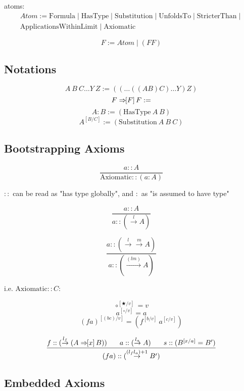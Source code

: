 \documentclass{article}
\newcommand{\presep}{\hspace{1.8em}}
\newcommand{\subst}[3]{#1^{[{#2}{/}{#3}]}}
\newcommand{\bindvariable}{\bigstar}
\newcommand{\hole}{\circ}
\newcommand{\hastype}[2]{#1 : #2}
\newcommand{\hastypemeta}[2]{#1 :: #2}
\newcommand{\treemappinguntyped}[2]{\Rightarrow\hspace{-0.4em}[#1]\,#2}
\newcommand{\treemappingtype}[3]{#1 \treemappinguntyped{#2}{#3}}
\newcommand{\unfoldsin}[1]{\overset{#1}{\rightarrow}}
\begin{document}
  
  atoms:
  \begin{multline*}
   Atom := \mathrm{Formula} \mid \mathrm{HasType} \mid \mathrm{Substitution} \mid \mathrm{UnfoldsTo} \mid \mathrm{StricterThan} \mid\\
   \mathrm{ApplicationsWithinLimit} \mid \mathrm{Axiomatic}
  \end{multline*}


  \[ F := Atom \mid (F F) \]


  \subsection{Notations}

  \[ A\ B\ C \dots Y\ Z := ((\dots ((A B) C) \dots Y) Z) \]
  \[ \treemappingtype{F}{F}{F} := \]
  \[ \hastype{A}{B} := (\mathrm{HasType}\ A\ B) \]
  \[ \subst{A}{B}{C} := (\mathrm{Substitution}\ A\ B\ C) \]

  \subsection{Bootstrapping Axioms}

  \[ \frac{\hastypemeta{a}{A}}{\hastypemeta{\mathrm{Axiomatic}}{(\hastype{a}{A})}} \]



  $::$ can be read as "has type globally", and $:$ as "is assumed to have type"

  \[ \frac{
    \hastypemeta{a}{A}
  }{
    \hastypemeta{a}{(\unfoldsin{l}A)}
  } \]

  \[ \frac{
    \hastypemeta{a}{(\unfoldsin{l}\unfoldsin{m}A)}
  }{
    \hastypemeta{a}{(\unfoldsin{(l m)}A)}
  } \]

  i.e. $\hastypemeta{\mathrm{Axiomatic}}{C}$:

  \[\subst{\hole}{\bindvariable}{v} = v\]
  \[\subst{a}{\hole}{v} = a\]
  \[\subst{(f a)}{(bc)}{v} = (\subst{f}{b}{v}\ \subst{a}{c}{v})\]

  \[ \frac{
    \hastypemeta{f}{(\unfoldsin{l_f} (\treemappingtype{A}{x}{B}))}
    \presep
    \hastypemeta{a}{(\unfoldsin{l_a} A)}
    \presep
    \hastypemeta{s}{(\subst{B}{x}{a} = B')}
  }{
    \hastypemeta{(f a)}{(\unfoldsin{(l_f l_a)+1} B')}
  } \]

  \subsection{Embedded Axioms}
  
\end{document}

